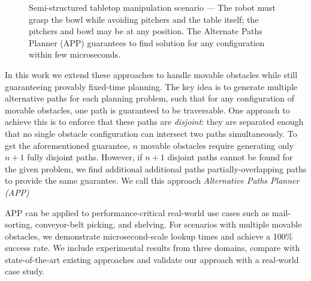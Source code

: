 \documentclass[a4paper]{report}
\begin{document}
\begin{figure}[bt]
\centering
\caption{Semi-structured tabletop manipulation scenario --- The robot must grasp the bowl while avoiding pitchers and the table itself; the pitchers and bowl may be at any position. The Alternate Paths Planner (APP) guarantees to find solution for any configuration within few microseconds.}
\label{fig:cover}
\vskip -0.5cm
\end{figure}

In this work we extend these approaches to handle movable obstacles while still guaranteeing provably fixed-time planning.
The key idea is to generate multiple alternative paths for each planning problem, such that for any configuration of movable obstacles, one path is guaranteed to be traversable.
One approach to achieve this is to enforce %
that these paths are \emph{disjoint}: they are separated enough that no single obstacle configuration can intersect two paths simultaneously.
To get the aforementioned guarantee, $n$ movable obstacles require generating only $n+1$ fully disjoint paths.
However, if $n+1$ disjoint paths cannot be found for the given problem, we find additional additional paths partially-overlapping paths to provide the same guarantee.
We call this approach \emph{Alternative Paths Planner (APP)}

APP can be applied to performance-critical real-world use cases such as mail-sorting, conveyor-belt picking, and shelving. 
For scenarios with multiple movable obstacles, we demonstrate microsecond-scale lookup times and achieve a 100\% success rate. We include experimental results from three domains, compare with state-of-the-art existing approaches and validate our approach with a real-world case study. 
\end{document}
